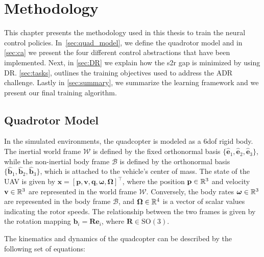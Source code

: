 
\chapter{Methodology}\label{meth}
This chapter presents the methodology used in this thesis to train the neural control policies.
In~\autoref{sec:quad_model}, we define the quadrotor model and in \autoref{sec:ca} we present the four different control abstractions that have been implemented.
Next, in \autoref{sec:DR} we explain how the \ac{s2r} gap is minimized by using \ac{DR}.
\autoref{sec:tasks}, outlines the training objectives used to address the \ac{ADR} challenge.
Lastly in \autoref{sec:summary}, we summarize the learning framework  and we present our final training algorithm.



\section{Quadrotor Model}\label{sec:quad_model}
In the simulated environments, the quadcopter is modeled as a 6\ac{dof} rigid body.
The inertial world frame $\mathcal{W}$ is defined by the fixed orthonormal basis $\{\hat{\mathbf{e}}_1, \hat{\mathbf{e}}_2, \hat{\mathbf{e}}_3\}$, while the non-inertial body frame $\mathcal{B}$ is defined by the orthonormal basis $\{\hat{\mathbf{b}}_1, \hat{\mathbf{b}}_2, \hat{\mathbf{b}}_3\}$, which is attached to the vehicle's center of mass.  
The state of the \ac{UAV} is given by $\mathbf{x} = [\mathbf{p}, \mathbf{v}, \mathbf{q}, \boldsymbol{\omega}, \mathbf{\Omega}]^\top$, where the position $\mathbf{p} \in \mathbb{R}^3$ and velocity $\mathbf{v} \in \mathbb{R}^3$ are represented in the world frame $\mathcal{W}$. 
Conversely, the body rates $\boldsymbol{\omega} \in \mathbb{R}^3$ are represented in the body frame $\mathcal{B}$, and $\mathbf{\Omega} \in \mathbb{R}^4$ is a vector of scalar values indicating the rotor speeds.
The relationship between the two frames is given by the rotation mapping $\mathbf{b}_i = \mathbf{R}\mathbf{e}_i$, where $\mathbf{R} \in \mathrm{SO}(3)$.

The kinematics and dynamics of the quadcopter can be described by the following set of equations:


